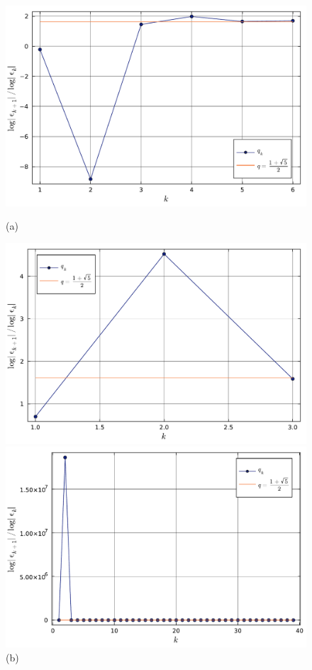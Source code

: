 \documentclass[letterpaper, 12pt]{article}
\numberwithin{equation}{section}    %
\begin{document}
\begin{figure}[!ht]
    \centering
    \begin{minipage}[b]{0.32\textwidth}
        \centering
        \includegraphics[width=\textwidth]{3421.pdf}
        \caption*{(a)}
    \end{minipage}
    \hfill
    \begin{minipage}[b]{0.32\textwidth}
        \centering
        \includegraphics[width=\textwidth]{3422.pdf}
        \caption*{(b)}
    \end{minipage}
    \hfill
    \begin{minipage}[b]{0.32\textwidth}
        \centering
        \includegraphics[width=\textwidth]{3423.pdf}

\end{minipage}
\end{figure}
\end{document}
